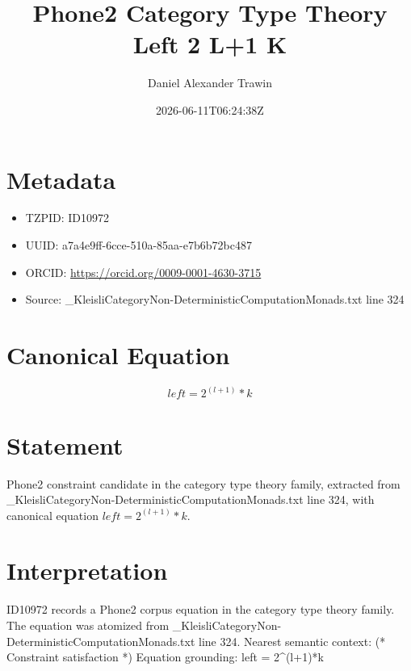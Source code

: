 \documentclass[11pt]{article}
\title{Phone2 Category Type Theory Left 2 L+1 K}
\author{Daniel Alexander Trawin}
\date{2026-06-11T06:24:38Z}
\begin{document}
\maketitle
\section*{Metadata}
\begin{itemize}
\item TZPID: ID10972
\item UUID: a7a4e9ff-6cce-510a-85aa-e7b6b72bc487
\item ORCID: \url{https://orcid.org/0009-0001-4630-3715}
\item Source: _KleisliCategoryNon-DeterministicComputationMonads.txt line 324
\end{itemize}
\section*{Canonical Equation}
\[
left = 2^(l+1)*k
\]
\section*{Statement}
Phone2 constraint candidate in the category type theory family, extracted from _KleisliCategoryNon-DeterministicComputationMonads.txt line 324, with canonical equation $left = 2^(l+1)*k$.
\section*{Interpretation}
ID10972 records a Phone2 corpus equation in the category type theory family. The equation was atomized from _KleisliCategoryNon-DeterministicComputationMonads.txt line 324. Nearest semantic context: (* Constraint satisfaction *) Equation grounding: left = 2^(l+1)*k
\end{document}

